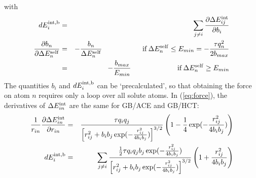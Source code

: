 \documentclass[12pt]{report}
\begin{document}
with
\begin{eqnarray}
dE^{\rm int,b}_i &=& 
   \sum_{j \neq i} \frac{\partial \Delta E^{\rm int}_{ij}}{\partial b_i} \label{eq:deintb} \\
\frac{\partial b_n}{\partial \Delta E^{\rm self}_n} &=&
     - \frac{b_n}{\Delta E^{\rm self}_n}       \hspace*{20mm} {\rm if } \, 
   \Delta E^{\rm self}_n \leq E_{min} =  - \frac{\tau q_n^2}{2 b_{max}} \nonumber \\
&=& - \frac{b_{max}}{E_{min}}  \hspace*{23mm} {\rm if } \, 
                                     \Delta E^{\rm self}_n \geq E_{min} \label{eq:dbdE}
\end{eqnarray}
The quantities $b_i$ and $dE^{\rm int,b}_i$ can be `precalculated', so that obtaining
the force on atom $n$ requires only a loop over all solute atoms. In (\ref{eq:force}),
the derivatives of $\Delta E^{\rm int}_{in}$ are the same for GB/ACE and GB/HCT:
\begin{eqnarray}
\frac{1}{r_{in}} \frac{\partial \Delta E^{\rm int}_{in}}{\partial r_{in}} &=&
  \frac{ \tau q_i q_j }{\left[ r_{ij}^2 + b_i b_j \exp(-\frac{r_{ij}^2}{4b_i b_j})\right]^{3/2}}
\left( 1 - \frac{1}{4} \exp(-\frac{r_{ij}^2}{4b_i b_j}) \right) \\
dE^{\rm int,b}_i &=& \sum_{j \neq i} 
  \frac{ \frac{1}{2} \tau q_i q_j b_j \exp(-\frac{r_{ij}^2}{4b_i b_j})}
       {\left[r_{ij}^2 + b_i b_j \exp(-\frac{r_{ij}^2}{4b_i b_j})\right]^{3/2}}
   \left(1 +  \frac{r_{ij}^2}{4b_i b_j} \right) 
\end{eqnarray}
\end{document}
